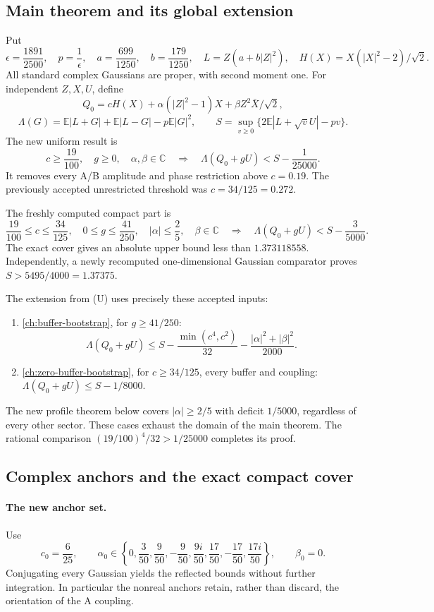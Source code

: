 \subsection{Main theorem and its global extension}
Put
\[
 \epsilon=\frac{1891}{2500},\quad p=\frac1\epsilon,\quad
 a=\frac{699}{1250},\quad b=\frac{179}{1250},\quad
 L=Z(a+b|Z|^2),\quad H(X)=X(|X|^2-2)/\sqrt2.
\]
All standard complex Gaussians are proper, with second moment one.
For independent $Z,X,U$, define
\[
 Q_0=cH(X)+\alpha(|Z|^2-1)X+\beta Z^2\bar X/\sqrt2,
\]
\[
 \Lambda(G)=\mathbb E|L+G|+\mathbb E|L-G|-p\mathbb E|G|^2,
 \qquad S=\sup_{v\ge0}\{2\mathbb E|L+\sqrt vU|-pv\}.
\]
The new uniform result is
\[
 \boxed{c\ge\frac{19}{100},\quad g\ge0,\quad
 \alpha,\beta\in\mathbb C
 \quad\Longrightarrow\quad
 \Lambda(Q_0+gU)<S-\frac1{25000}.}
\]
It removes every A/B amplitude and phase restriction above $c=0.19$.
The previously accepted unrestricted threshold was $c=34/125=0.272$.

The freshly computed compact part is
\[
 \boxed{\frac{19}{100}\le c\le\frac{34}{125},\quad
 0\le g\le\frac{41}{250},\quad|\alpha|\le\frac25,\quad
 \beta\in\mathbb C
 \quad\Longrightarrow\quad
 \Lambda(Q_0+gU)<S-\frac3{5000}.}
 \tag{U}
\]
The exact cover gives an absolute upper bound less than
$1.373118558$. Independently, a newly recomputed one-dimensional
Gaussian comparator proves $S>5495/4000=1.37375$.

The extension from (U) uses precisely these accepted inputs:
\begin{enumerate}
\item \autoref{ch:buffer-bootstrap}, for $g\ge41/250$:
\[
 \Lambda(Q_0+gU)\le S-\frac{\min(c^4,c^2)}{32}
                         -\frac{|\alpha|^2+|\beta|^2}{2000}.
\]
\item \autoref{ch:zero-buffer-bootstrap}, for $c\ge34/125$, every buffer and coupling:
$\Lambda(Q_0+gU)\le S-1/8000$.
\end{enumerate}
The new profile theorem below covers $|\alpha|\ge2/5$ with deficit
$1/5000$, regardless of every other sector. These cases exhaust the
domain of the main theorem. The rational comparison
$(19/100)^4/32>1/25000$ completes its proof.



\subsection{Complex anchors and the exact compact cover}
\paragraph{The new anchor set.}
Use
\[
 c_0=\frac6{25},\qquad
 \alpha_0\in
 \left\{0,\frac3{50},\frac9{50},-\frac9{50},
 \frac{9i}{50},\frac{17}{50},-\frac{17}{50},\frac{17i}{50}\right\},
 \qquad\beta_0=0.
\]
Conjugating every Gaussian yields the reflected bounds without further
integration. In particular the nonreal anchors retain, rather than
discard, the orientation of the A coupling.

